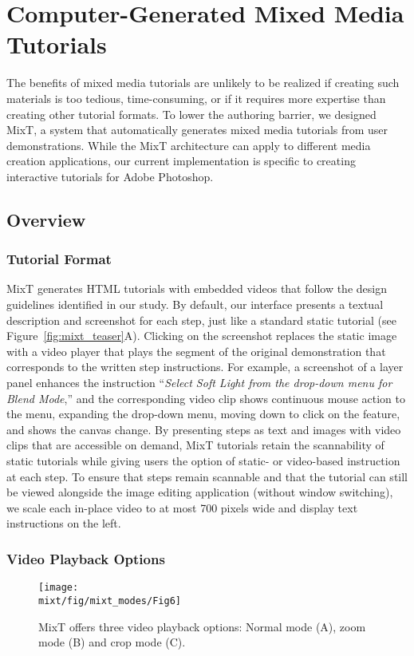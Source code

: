 \section{Computer-Generated Mixed Media Tutorials}

The benefits of mixed media tutorials are unlikely to be realized if creating such materials is too tedious, time-consuming, or if it requires more expertise than creating other tutorial formats. To lower the authoring barrier, we designed MixT, a system that automatically generates mixed media tutorials from user demonstrations. While the MixT architecture can apply to different media creation applications, our current implementation is specific to creating interactive tutorials for Adobe Photoshop.

\subsection{Overview}
\subsubsection{Tutorial Format}
MixT generates HTML tutorials with embedded videos that follow the design guidelines identified in our study. By default, our interface presents a textual description and screenshot for each step, just like a standard static tutorial (see Figure~\ref{fig:mixt_teaser}A). Clicking on the screenshot replaces the static image with a video player that plays the segment of the original demonstration that corresponds to the written step instructions. For example, a screenshot of a layer panel enhances the instruction ``\emph{Select Soft Light from the drop-down menu for Blend Mode},'' and the corresponding video clip shows continuous mouse action to the menu, expanding the drop-down menu, moving down to click on the feature, and shows the canvas change. By presenting steps as text and images with video clips that are accessible on demand, MixT tutorials retain the scannability of static tutorials while giving users the option of static- or video-based instruction at each step. To ensure that steps remain scannable and that the tutorial can still be viewed alongside the image editing application (without window switching), we scale each in-place video to at most 700 pixels wide and display text instructions on the left.

\subsubsection{Video Playback Options }
\begin{figure*}[b!]
  \centering
  \texttt{[image: \\mixt/fig/mixt\_modes/Fig6]}
  \caption{MixT offers three video playback options: Normal mode (A), zoom mode (B) and crop mode (C).}
  \label{fig:mixt_modes}
\end{figure*}

